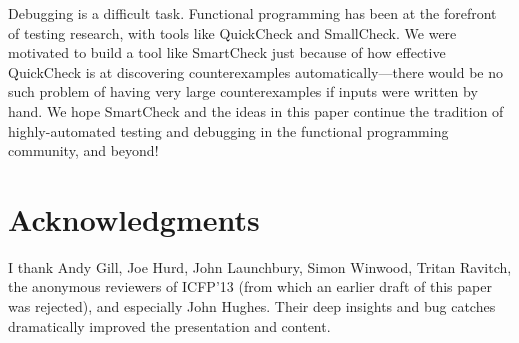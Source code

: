 \documentclass{sigplanconf}
\begin{document}

Debugging is a difficult task.  Functional programming has been at the forefront
of testing research, with tools like QuickCheck and SmallCheck.  We were
motivated to build a tool like SmartCheck just because of how effective
QuickCheck is at discovering counterexamples automatically---there would be no
such problem of having very large counterexamples if inputs were written by
hand.  We hope SmartCheck and the ideas in this paper continue the tradition of
highly-automated testing and debugging in the functional programming community,
and beyond!



\section*{Acknowledgments}
I thank Andy Gill, Joe Hurd, John Launchbury, Simon Winwood, Tritan Ravitch, the
anonymous reviewers of ICFP'13 (from which an earlier draft of this paper was
rejected), and especially John Hughes.  Their deep insights and bug catches
dramatically improved the presentation and content.




\balancecolumns
\end{document}
